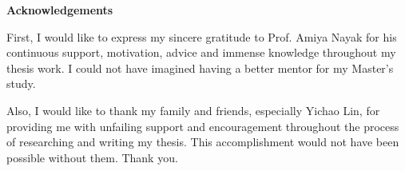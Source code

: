 
\begin{center}\textbf{Acknowledgements}\end{center}

\noindent First, I would like to express my sincere gratitude to Prof. Amiya Nayak for his continuous support, motivation, advice and immense knowledge throughout my thesis work. I could not have imagined having a better mentor for my Master's study.

Also, I would like to thank my family and friends, especially Yichao Lin, for providing me with unfailing support and encouragement throughout the process of researching and writing my thesis. This accomplishment would not have been possible without them. Thank you.







\cleardoublepage
